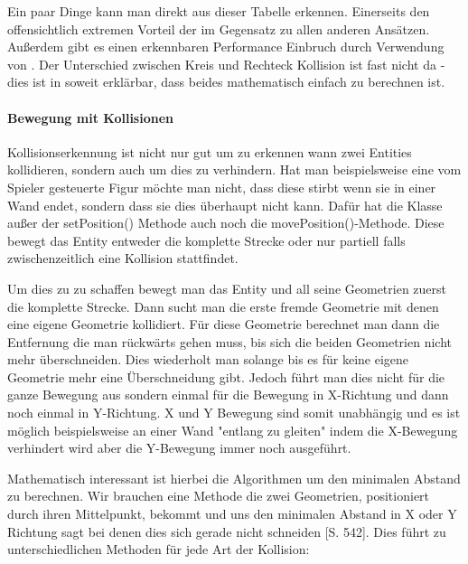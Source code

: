 \vspace*{1 cm}

Ein paar Dinge kann man direkt aus dieser Tabelle erkennen. Einerseits den offensichtlich extremen Vorteil der  im Gegensatz zu allen anderen Ansätzen. Außerdem gibt es einen erkennbaren Performance Einbruch durch Verwendung von . Der Unterschied zwischen Kreis und Rechteck Kollision ist fast nicht da - dies ist in soweit erklärbar, dass beides mathematisch einfach zu berechnen ist.


\paragraph{Bewegung mit Kollisionen}

Kollisionserkennung ist nicht nur gut um zu erkennen wann zwei Entities kollidieren, sondern auch um dies zu verhindern. Hat man beispielsweise eine vom Spieler gesteuerte Figur möchte man nicht, dass diese stirbt wenn sie in einer Wand endet, sondern dass sie dies überhaupt nicht kann.
Dafür hat die Klasse  außer der setPosition() Methode auch noch die movePosition()-Methode. Diese bewegt das Entity entweder die komplette Strecke oder nur partiell falls zwischenzeitlich eine Kollision stattfindet.

Um dies zu zu schaffen bewegt man das Entity und all seine Geometrien zuerst die komplette Strecke. Dann sucht man die erste fremde Geometrie mit denen eine eigene Geometrie kollidiert. Für diese Geometrie berechnet man dann die Entfernung die man rückwärts gehen muss, bis sich die beiden Geometrien nicht mehr überschneiden. Dies wiederholt man solange bis es für keine eigene Geometrie mehr eine Überschneidung gibt. Jedoch führt man dies nicht für die ganze Bewegung aus sondern einmal für die Bewegung in X-Richtung und dann noch einmal in Y-Richtung. X und Y Bewegung sind somit unabhängig und es ist möglich beispielsweise an einer Wand "entlang zu gleiten" indem die X-Bewegung verhindert wird aber die Y-Bewegung immer noch ausgeführt.

Mathematisch interessant ist hierbei die Algorithmen um den minimalen Abstand zu berechnen. Wir brauchen eine Methode die zwei Geometrien, positioniert durch ihren Mittelpunkt, bekommt und uns den minimalen Abstand in X oder Y Richtung sagt bei denen dies sich gerade nicht schneiden \cite{EMFGAIA}[S. 542]. Dies führt zu unterschiedlichen Methoden für jede Art der Kollision:

